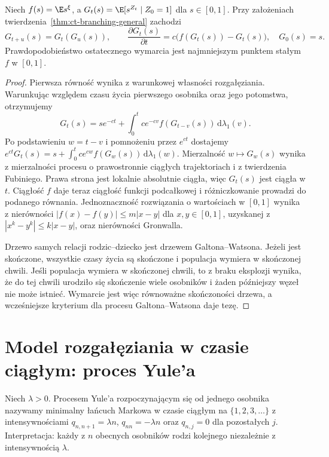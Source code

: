 \begin{twierdzenie}
\label{thm:ct-branching-pgf}
Niech $f(s)=\E s^\xi$, a
$G_t(s)=\E[s^{Z_t}\mid Z_0=1]$ dla $s\in[0,1]$.
Przy założeniach twierdzenia~\ref{thm:ct-branching-general}
zachodzi
\[
G_{t+u}(s)=G_t(G_u(s)),\qquad
\frac{\partial G_t(s)}{\partial t}
=c\bigl(f(G_t(s))-G_t(s)\bigr),\quad G_0(s)=s.
\]
Prawdopodobieństwo ostatecznego wymarcia jest
najmniejszym punktem stałym $f$ w $[0,1]$.
\end{twierdzenie}
\begin{proof}
Pierwsza równość wynika z warunkowej własności
rozgałęziania. Warunkując względem czasu życia
pierwszego osobnika oraz jego potomstwa, otrzymujemy
\[
G_t(s)=s e^{-ct}
+\int_0^t c e^{-cv} f(G_{t-v}(s))\,\mathrm d\lambda_1(v).
\]
Po podstawieniu $w=t-v$ i pomnożeniu przez $e^{ct}$
dostajemy
$e^{ct}G_t(s)=s+\int_0^t c e^{cw}f(G_w(s))
\,\mathrm d\lambda_1(w)$.
Mierzalność $w\mapsto G_w(s)$ wynika z mierzalności
procesu o prawostronnie ciągłych trajektoriach
i z twierdzenia Fubiniego. Prawa strona jest
lokalnie absolutnie ciągła, więc $G_t(s)$
jest ciągła w $t$. Ciągłość $f$ daje teraz
ciągłość funkcji podcałkowej i różniczkowanie
prowadzi do podanego równania.
Jednoznaczność rozwiązania o wartościach w $[0,1]$
wynika z nierówności
$|f(x)-f(y)|\le m|x-y|$ dla $x,y\in[0,1]$,
uzyskanej z $|x^k-y^k|\le k|x-y|$,
oraz nierówności Gronwalla.

Drzewo samych relacji rodzic--dziecko jest
drzewem Galtona--Watsona. Jeżeli jest skończone,
wszystkie czasy życia są skończone i populacja
wymiera w skończonej chwili. Jeśli populacja
wymiera w skończonej chwili, to z braku eksplozji
wynika, że do tej chwili urodziło się skończenie
wiele osobników i żaden późniejszy węzeł nie
może istnieć. Wymarcie jest więc równoważne
skończoności drzewa, a wcześniejsze kryterium
dla procesu Galtona--Watsona daje tezę.
\end{proof}

\section{Model rozgałęziania w czasie ciągłym: proces Yule'a}
\begin{definicja}
Niech $\lambda>0$. Procesem Yule'a rozpoczynającym się
od jednego osobnika nazywamy minimalny łańcuch Markowa
w czasie ciągłym na $\{1,2,3,\ldots\}$ z intensywnościami
$q_{n,n+1}=\lambda n$, $q_{nn}=-\lambda n$ oraz
$q_{n,j}=0$ dla pozostałych $j$.
Interpretacja: każdy z $n$ obecnych osobników rodzi
kolejnego niezależnie z intensywnością $\lambda$.
\end{definicja}

